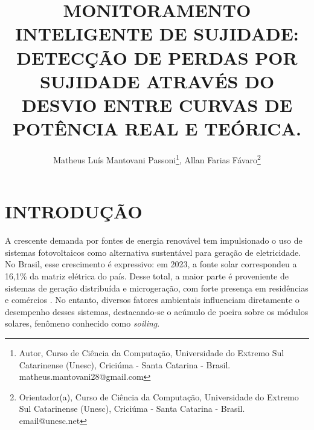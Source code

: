 \documentclass{UNESC}
\title {MONITORAMENTO INTELIGENTE DE SUJIDADE:
DETECÇÃO DE PERDAS POR SUJIDADE ATRAVÉS DO DESVIO ENTRE CURVAS DE POTÊNCIA REAL E TEÓRICA.}
\author
{
   Matheus Luís Mantovani Passoni\footnote{Autor, Curso de Ciência da Computação, Universidade do Extremo Sul Catarinense (Unesc), Criciúma - Santa Catarina - Brasil. matheus.mantovani28@gmail.com},
   Allan Farias Fávaro\footnote{Orientador(a), Curso de Ciência da Computação, Universidade do Extremo Sul Catarinense (Unesc), Criciúma - Santa Catarina - Brasil. email@unesc.net}
}
\begin{document}
\onehalfspacing

\maketitle

\section{INTRODUÇÃO}

A crescente demanda por fontes de energia renovável tem impulsionado o uso de sistemas fotovoltaicos como alternativa sustentável para geração de eletricidade. No Brasil, esse crescimento é expressivo: em 2023, a fonte solar correspondeu a 16,1\% da matriz elétrica do país. Desse total, a maior parte é proveniente de sistemas de geração distribuída e microgeração, com forte presença em residências e comércios \cite{Tramontin_Rampinelli_2024}. No entanto, diversos fatores ambientais influenciam diretamente o desempenho desses sistemas, destacando-se o acúmulo de poeira sobre os módulos solares, fenômeno conhecido como \textit{soiling}.
\end{document}
